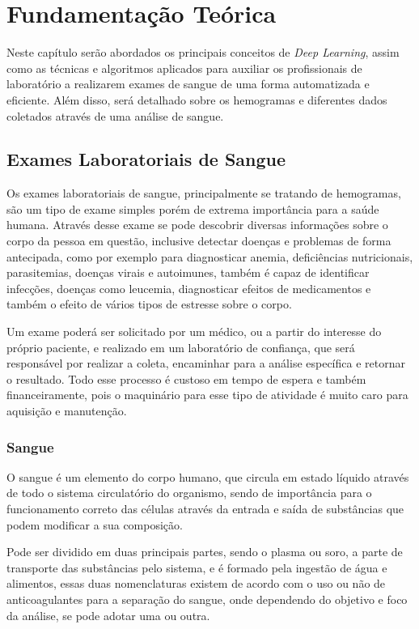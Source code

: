 \chapter{Fundamentação Teórica}
\label{chap:fund}

Neste capítulo serão abordados os principais conceitos de \emph{Deep Learning}, assim como as técnicas e algoritmos aplicados para auxiliar os profissionais de laboratório a realizarem exames de sangue de uma forma automatizada e eficiente. Além disso, será detalhado sobre os hemogramas e diferentes dados coletados através de uma análise de sangue.

\section{Exames Laboratoriais de Sangue}
\label{sec:conceito1}
Os exames laboratoriais de sangue, principalmente se tratando de hemogramas, são um tipo de exame simples porém de extrema importância para a saúde humana. Através desse exame se pode descobrir diversas informações sobre o corpo da pessoa em questão, inclusive detectar doenças e problemas de forma antecipada, como por exemplo para diagnosticar anemia, deficiências nutricionais, parasitemias, doenças virais e autoimunes, também é capaz de identificar infecções, doenças como leucemia, diagnosticar efeitos de medicamentos e também o efeito de vários tipos de estresse sobre o corpo. \cite{bloodbook}

Um exame poderá ser solicitado por um médico, ou a partir do interesse do próprio paciente, e realizado em um laboratório de confiança, que será responsável por realizar a coleta, encaminhar para a análise específica e retornar o resultado. Todo esse processo é custoso em tempo de espera e também financeiramente, pois o maquinário para esse tipo de atividade é muito caro para aquisição e manutenção.

\subsection{Sangue}
O sangue é um elemento do corpo humano, que circula em estado líquido através de todo o sistema circulatório do organismo, sendo de importância para o funcionamento correto das células através da entrada e saída de substâncias que podem modificar a sua composição.

Pode ser dividido em duas principais partes, sendo o plasma ou soro, a parte de transporte das substâncias pelo sistema, e é formado pela ingestão de água e alimentos, essas duas nomenclaturas existem de acordo com o uso ou não de anticoagulantes para a separação do sangue, onde dependendo do objetivo e foco da análise, se pode adotar uma ou outra.

